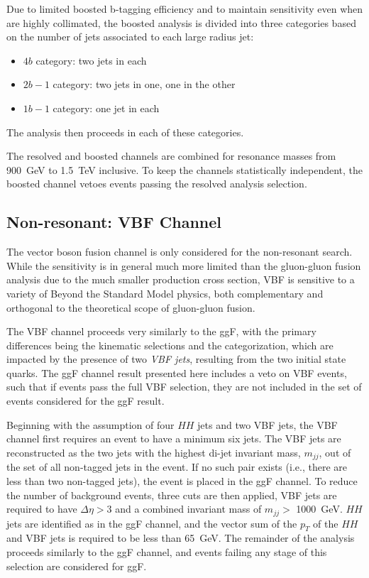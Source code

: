 Due to limited boosted b-tagging efficiency and to maintain sensitivity 
even when \bjets are highly collimated, the boosted analysis is divided into three categories 
based on the number of \btagged jets associated to each large radius jet:
\begin{itemize}
	\item $4b$ category: two \btagged jets in each
	\item $2b-1$ category: two \btagged jets in one, one in the other
	\item $1b-1$ category: one \btagged jet in each
\end{itemize} 

The analysis then proceeds in each of these categories.

The resolved and boosted channels are combined for resonance masses from \SI{900}{\GeV} 
to \SI{1.5}{\TeV} inclusive. To keep the channels statistically independent, the boosted channel 
vetoes events passing the resolved analysis selection.


\subsection{Non-resonant: VBF Channel} 
The vector boson fusion channel is only considered for the non-resonant search. While the 
sensitivity is in general much more limited than the gluon-gluon fusion analysis due to the 
much smaller production cross section, VBF is sensitive to a variety of Beyond the Standard 
Model physics, both complementary and orthogonal to the theoretical scope of gluon-gluon fusion. 

The VBF channel proceeds very similarly to the ggF, with the primary differences being the 
kinematic selections and the categorization, which are impacted by the 
presence of two \emph{VBF jets}, resulting from the two initial state quarks. The ggF channel 
result presented here includes a veto on VBF events, such that if events pass the full 
VBF selection, they are not included in the set of events considered for the ggF result.

Beginning with the assumption of four $HH$ jets and two VBF jets, the VBF channel first requires an 
event to have a minimum six jets. The VBF jets are reconstructed as the two jets with the 
highest di-jet invariant mass, $m_{jj}$, out of the set of all non-tagged jets in the event. If no such pair 
exists (i.e., there are less than two non-tagged jets), the event is placed in the ggF channel. 
To reduce the number of background events, three cuts are then applied, VBF jets are required to have 
$\Delta \eta > 3$ and a combined invariant mass of $m_{jj}>$ \SI{1000}{\GeV}. $HH$ jets are identified 
as in the ggF channel, and the vector sum of the $p_{T}$ of the $HH$ and VBF jets is required to be 
less than \SI{65}{\GeV}. The remainder of the analysis proceeds similarly to the ggF channel, and 
events failing any stage of this selection are considered for ggF.

